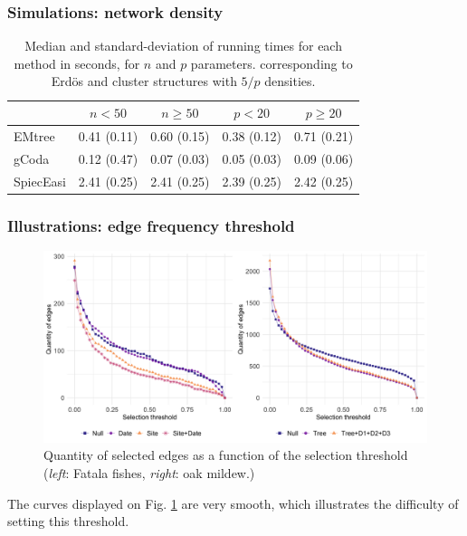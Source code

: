 \subsubsection{Simulations: network density}

\begin{table}[H]
\centering
\begin{tabular}{l|rr|rr}
    & \multicolumn{1}{c}{$n < 50$} & \multicolumn{1}{c}{$n\geq 50$} & \multicolumn{1}{c}{$p < 20$} & \multicolumn{1}{c}{$p\geq 20$} \\  \hline
  EMtree    &   0.41 (0.11)	&   0.60 (0.15) &   0.38 (0.12) &    0.71 (0.21)      \\ 
  gCoda     &   0.12 (0.47)	&   0.07 (0.03) &   0.05 (0.03) &    0.09 (0.06)     \\ 
  SpiecEasi &   2.41 (0.25)	&   2.41 (0.25) &   2.39 (0.25) &    2.42 (0.25)      \\ 
   \hline
\end{tabular}
\caption{Median and standard-deviation of running times for each method in seconds, for $n$ and $p$ parameters. corresponding to Erdös and cluster structures with $5/p$ densities.}
\label{timeDenser}
\end{table}
 
\subsubsection{Illustrations: edge frequency threshold}

\begin{figure}[H]
    \centering
    \includegraphics[width=\linewidth]{figs/QET_twoDataSets.png}
    \caption{Quantity of selected edges as a function of the selection threshold (\textit{left}: Fatala fishes, \textit{right}: oak mildew.)}
    \label{QETOak}
\end{figure}

The curves displayed on Fig. \ref{QETOak} are very smooth, which illustrates the difficulty of setting this threshold.


